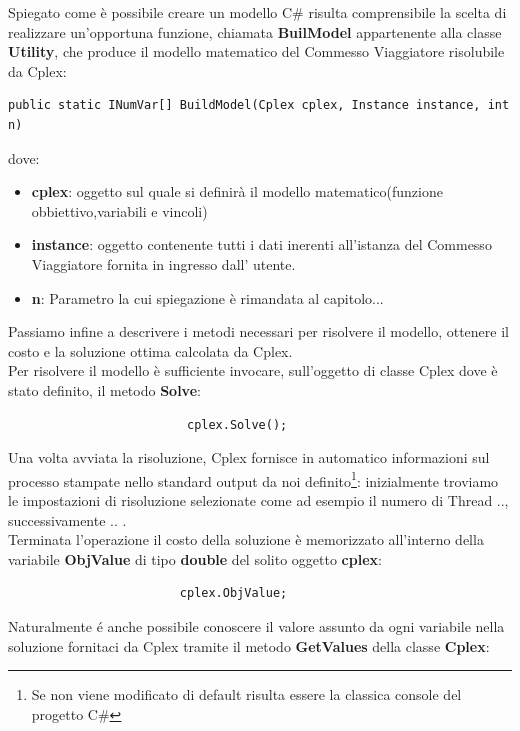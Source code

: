 \documentclass[11pt]{article}
\begin{document}
Spiegato come \`e possibile creare un modello C\# risulta comprensibile la scelta di realizzare un'opportuna funzione, chiamata \textbf{BuilModel} appartenente alla classe \textbf{Utility}, che produce il modello matematico del Commesso Viaggiatore risolubile da Cplex:

\begin{lstlisting}
public static INumVar[] BuildModel(Cplex cplex, Instance instance, int n)
\end{lstlisting}

dove:

\begin{itemize}
\item \textbf{cplex}: oggetto sul quale si definirà il modello matematico(funzione obbiettivo,variabili e vincoli)
\item \textbf{instance}: oggetto contenente tutti i dati inerenti all'istanza del Commesso Viaggiatore fornita in ingresso dall' utente.
\item \textbf{n}: Parametro la cui spiegazione \`e rimandata al capitolo...
\end{itemize}

Passiamo infine a descrivere i metodi necessari per risolvere il modello, ottenere il costo e la soluzione ottima calcolata da Cplex.\\

Per risolvere il modello \`e sufficiente invocare, sull'oggetto di classe Cplex dove \`e stato definito, il metodo \textbf{Solve}:

\begin{lstlisting}
                         cplex.Solve();
\end{lstlisting}

Una volta avviata la risoluzione, Cplex fornisce in automatico informazioni sul processo stampate nello standard output da noi definito\footnote{Se non viene modificato di default risulta essere la classica console del progetto C\#}: inizialmente troviamo le impostazioni di risoluzione selezionate come ad esempio il numero di Thread .., successivamente ..  .\\
Terminata l'operazione il costo della soluzione \`e memorizzato all'interno della variabile \textbf{ObjValue} di tipo \textbf{double} del solito oggetto \textbf{cplex}:

\begin{lstlisting}
                        cplex.ObjValue; 
\end{lstlisting}

Naturalmente \'e anche possibile conoscere il valore assunto da ogni variabile nella soluzione fornitaci da Cplex tramite il metodo \textbf{GetValues} della classe \textbf{Cplex}:
\end{document}
